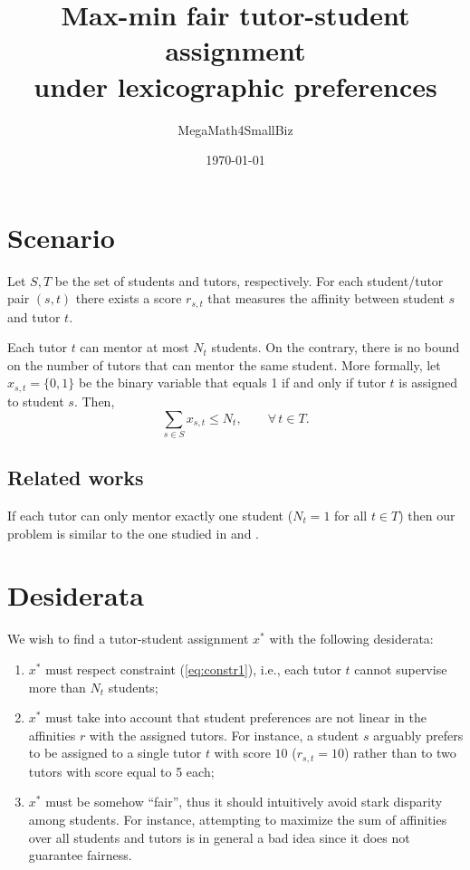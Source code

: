 \documentclass[11pt,oneside,a4paper]{article}     %
\title{Max-min fair tutor-student assignment\\under lexicographic preferences}
\date{\today}
\author{MegaMath4SmallBiz}
\begin{document}
\maketitle


\section{Scenario}

Let $S,T$ be the set of students and tutors, respectively. For each student/tutor pair $(s, t)$ there exists a score $r_{s,t}$ that measures the affinity between student $s$ and tutor $t$.

Each tutor $t$ can mentor at most $N_t$ students. On the contrary, there is no bound on the number of tutors that can mentor the same student. More formally, let $x_{s,t}=\{0,1\}$ be the binary variable that equals 1 if and only if tutor $t$ is assigned to student $s$. Then, 
\begin{equation} \label{eq:constr1}
\sum_{s\in S} x_{s,t} \le N_t, \qquad \forall\, t\in T.
\end{equation}



\subsection{Related works}

If each tutor can only mentor exactly one student ($N_t=1$ for all $t\in T$) then our problem is similar to the one studied in \cite{santaclaus06} and  \cite{chakrabarty2009allocating}. 



\section{Desiderata}

We wish to find a tutor-student assignment $x^*$ with the following desiderata:
\begin{enumerate}
\item $x^*$ must respect constraint (\ref{eq:constr1}), i.e., each tutor $t$ cannot supervise more than $N_t$ students;
\item $x^*$ must take into account that student preferences are not linear in the affinities $r$ with the assigned tutors. For instance, a student $s$ arguably prefers to be assigned to a single tutor $t$ with score $10$ ($r_{s,t}=10$) rather than to two tutors with score equal to 5 each;
\item $x^*$ must be somehow ``fair'', thus it should intuitively avoid stark disparity among students. For instance, attempting to maximize the sum of affinities over all students and tutors is in general a bad idea since it does not guarantee fairness.
\end{enumerate}
\end{document}
